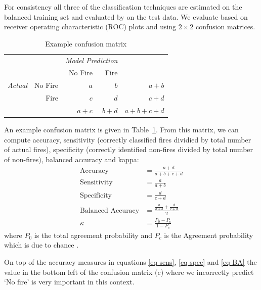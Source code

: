 \documentclass[11pt,a4paper]{article}
\begin{document}
For consistency all three of the classification techniques are estimated on the balanced training set and evaluated by  on the test data. We evaluate based on receiver operating characteristic (ROC) plots  and using $2\times2$ confusion matrices.

\begin{table}
  \centering
  \begin{tabular}{lrrrr}
    & 	\multicolumn{1}{l}{} & \multicolumn{2}{c}{\emph{Model Prediction}} \\
    & 	\multicolumn{1}{l}{} & \multicolumn{1}{r}{No Fire} & \multicolumn{1}{r}{Fire} \\
    \cline{3-5}
    \emph{Actual} & No Fire & $a$   & $b$   & $a+b$ \\
                  &   Fire  & $c$   & $d$   & $c + d$ \\
    \cline{3-5}
                  &         & $a+c$ & $b+d$ & $a+b+c+d$ \\
    \cline{3-5}
  \end{tabular}
  \caption{Example confusion matrix}
  \label{table:ex}
\end{table}
An example confusion matrix is given in Table~\ref{table:ex}.
From this matrix, we can compute accuracy, sensitivity (correctly classified fires dividied by total number of actual fires), specificity (correctly identified non-fires divided by total number of non-fires), balanced accuracy and kappa:
\begin{align}
  \label{eq acc}
  \mbox{Accuracy}          & = \frac{a + d}{a+b+c+d}                     \\
  \label{eq sens}
  \mbox{Sensitivity}       & = \frac{a }{a+b}                            \\
  \label{eq spec}
  \mbox{Specificity}       & = \frac{d}{c+d}                             \\
  \label{eq BA}
  \mbox{Balanced Accuracy} & = \frac{\frac{a }{a+b} + \frac{d}{c+d} }{2} \\
  \label{eq:K}
  \kappa                   & = \frac{P_0 - P_c}{1-P_c}
\end{align}
where $P_0$ is the total agreement probability and $P_c$ is the Agreement probability which is due to chance \citep[see][for definitions]{kappa}.

On top of the accuracy measures in equations \eqref{eq sens}, \eqref{eq spec} and \eqref{eq BA} the value in the bottom left of the confusion matrix (c) where we incorrectly predict `No fire' is very important in this context.
\end{document}
